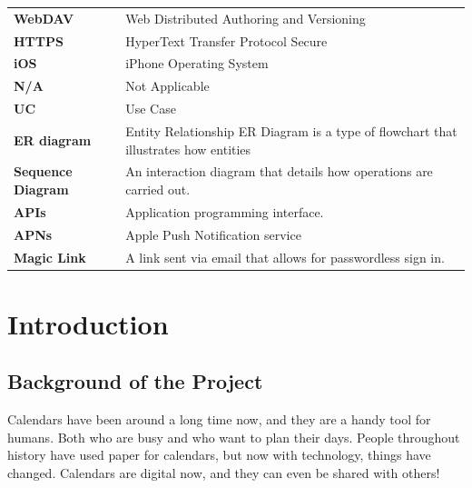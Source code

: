 \documentclass[12pt,a4paper]{report}
\begin{document}
\begin{singlespace}
\begin{center}
\begin{longtable}{p{}p{}}
    \textbf{WebDAV} & Web Distributed Authoring and Versioning \\[1ex]
    
    \textbf{HTTPS} & HyperText Transfer Protocol Secure \\[1ex]
    
    \textbf{iOS} & iPhone Operating System \\[1ex]
    
    \textbf{N/A} & Not Applicable \\[1ex]
    
    \textbf{UC} & Use Case \\[1ex]
    
    \textbf{ER diagram} & Entity Relationship ER Diagram is a type of flowchart that illustrates how entities \\[1ex]
    
    \textbf{Sequence Diagram} & An interaction diagram that details how operations are carried out. \\[1ex]
    
    \textbf{APIs} & Application programming interface. \\[1ex]
    
    \textbf{APNs} & Apple Push Notification service \\

    \textbf{Magic Link} & A link sent via email that allows for passwordless sign in. \\
    
    \bottomrule
    \end{longtable}
\end{center}

\end{singlespace}


\chapter{Introduction}


\section{Background of the Project}

 Calendars have been around a long time now, and they are a handy tool for humans. Both who are busy and who want to plan their days. People throughout history have used paper for calendars, but now with technology, things have changed. Calendars are digital now, and they can even be shared with others!
\end{document}
